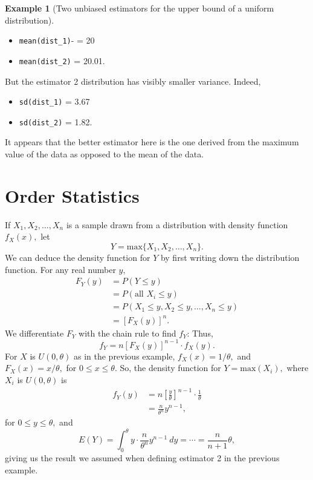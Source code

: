 \documentclass[
]{book}
\providecommand{\tightlist}{%
  \setlength{\itemsep}{0pt}\setlength{\parskip}{0pt}}
\theoremstyle{definition}
\theoremstyle{definition}
\newtheorem{example}{Example}[chapter]
\theoremstyle{definition}
\theoremstyle{definition}
\theoremstyle{remark}
\begin{document}
\begin{example}[Two unbiased estimators for the upper bound of a uniform distribution]
\begin{itemize}
\tightlist
\item
  \texttt{mean(dist\_1)}- = 20
\item
  \texttt{mean(dist\_2)} = 20.01.
\end{itemize}

But the estimator 2 distribution has visibly smaller variance. Indeed,

\begin{itemize}
\tightlist
\item
  \texttt{sd(dist\_1)} = 3.67
\item
  \texttt{sd(dist\_2)} = 1.82.
\end{itemize}

It appears that the better estimator here is the one derived from the maximum value of the data as opposed to the mean of the data.
\end{example}

\section{Order Statistics}\label{order-statistics}

If \(X_1, X_2, \ldots, X_n\) is a sample drawn from a distribution with density function \(f_X(x),\) let \[Y = \text{max}\{X_1, X_2, \ldots, X_n\}.\]
We can deduce the density function for \(Y\) by first writing down the distribution function. For any real number \(y,\)
\begin{align*}
F_Y(y) &= P(Y \leq y) \\
      &= P(\text{all }X_i \leq y) \\
      &= P(X_1 \leq y, X_2 \leq y, \ldots, X_n \leq y) \\
      &= \left[F_X(y)\right]^n.
\end{align*}
We differentiate \(F_Y\) with the chain rule to find \(f_Y\):
Thus, \[f_Y = n\left[F_X(y)\right]^{n-1}\cdot f_X(y). \tag{density for the max of sample}\]
For \(X\) is \(U(0,\theta)\) as in the previous example, \(f_X(x) = 1/\theta,\) and \(F_X(x) = x/\theta,\) for \(0 \leq x \leq \theta\). So, the density function for \(Y = \text{max}(X_i),\) where \(X_i\) is \(U(0,\theta)\) is
\begin{align*}
f_Y(y) &= n \left[\frac{y}{\theta}\right]^{n-1} \cdot \frac{1}{\theta}\\
      &= \frac{n}{\theta^n}y^{n-1},
\end{align*}
for \(0 \leq y \leq \theta,\)
and \[E(Y) = \int_0^\theta y \cdot \frac{n}{\theta^n}y^{n-1}~dy = \cdots = \frac{n}{n+1}\theta,\]
giving us the result we assumed when defining estimator 2 in the previous example.
\end{document}
